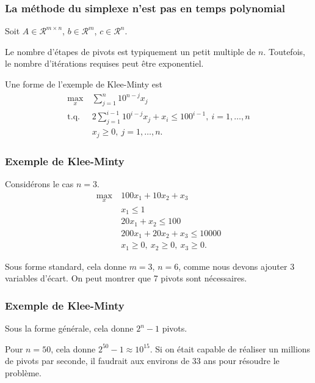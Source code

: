 \documentclass[t,usepdftitle=false]{beamer}
\def\cR{\mathcal{R}}
\begin{document}
\begin{frame}
\frametitle{La méthode du simplexe n'est pas en temps polynomial}

Soit $A \in \cR^{m \times n}$, $b \in \cR^m$, $c \in \cR^n$.

\mbox{}

Le nombre d'étapes de pivots est typiquement un petit multiple de $n$. Toutefois, le nombre d'itérations requises peut être exponentiel.

\mbox{}

Une forme de l'exemple de Klee-Minty est
\begin{align*}
\max_x \ & \sum_{j =1}^n 10^{n-j} x_j \\
\mbox{t.q. } & 2\sum_{j = 1}^{i-1} 10^{i-j} x_j + x_i \leq 100^{i-1},\ i = 1,\ldots, n\\
& x_j \geq 0,\ j = 1,\ldots, n.
\end{align*}

\end{frame}

\begin{frame}
\frametitle{Exemple de Klee-Minty}

Considérons le cas $n = 3$.
\begin{align*}
\max_x \ & 100x_1 + 10x_2 + x_3\\
& x_1 \leq 1 \\
& 20 x_1 + x_2 \leq 100 \\
& 200 x_1 + 20 x_2 + x_3 \leq 10000 \\
& x_1 \geq 0,\ x_2 \geq 0,\ x_3 \geq 0.
\end{align*}

\mbox{}

Sous forme standard, cela donne $m = 3$, $n = 6$, comme nous devons ajouter 3 variables d'écart. On peut montrer que 7 pivots sont nécessaires.

\end{frame}

\begin{frame}
\frametitle{Exemple de Klee-Minty}

Sous la forme générale, cela donne $2^n - 1$ pivots.

\mbox{}

Pour $n = 50$, cela donne $2^{50} - 1 \approx 10^{15}$. Si on était capable de réaliser un millions de pivots par seconde, il faudrait aux environs de 33 ans pour résoudre le problème.

\end{frame}
\end{document}
